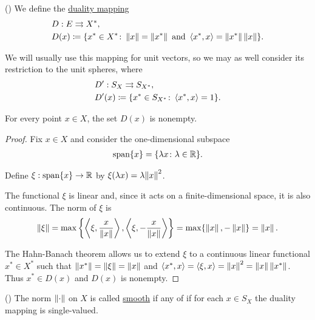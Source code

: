 \begin{definition}(\cite[Example 2.26]{Phelps1993})
  We define the \uline{duality mapping}
  \begin{align*}
    &D: E \rightrightarrows X^*, \\
    &D(x) \coloneqq \{ x^* \in X^* \colon \left\Vert x \right\Vert = \left\Vert x^* \right\Vert \text{ and } \left\langle x^*, x \right\rangle = \left\Vert x^* \right\Vert \left\Vert x \right\Vert \}.
  \end{align*}
\end{definition}

\begin{note}
  We will usually use this mapping for unit vectors, so we may as well consider its restriction to the unit spheres, where
  \begin{align*}
    &D': S_X \rightrightarrows S_{X^*}, \\
    &D'(x) \coloneqq \{ x^* \in S_{X^*} \colon \left\langle x^*, x \right\rangle = 1 \}.
  \end{align*}
\end{note}

\begin{lemma}\label{thm:nonempty_banach_duality_mapping}
  For every point $x \in X$, the set $D(x)$ is nonempty.
\end{lemma}
\begin{proof}
  Fix $x \in X$ and consider the one-dimensional subspace
  \begin{align*}
    \operatorname{span} \{ x \}
    =
    \{ \lambda x \colon \lambda \in \mathbb{R} \}.
  \end{align*}

  Define $\xi: \operatorname{span} \{ x \} \to \mathbb{R}$ by $\xi(\lambda x) = \lambda {\left\Vert x \right\Vert}^2$.

  The functional $\xi$ is linear and, since it acts on a finite-dimensional space, it is also continuous. The norm of $\xi$ is
  \begin{align*}
    \left\Vert \xi \right\Vert = \max \left\{ \left\langle \xi, \frac x {\left\Vert x \right\Vert} \right\rangle, \left\langle \xi, -\frac x {\left\Vert x \right\Vert} \right\rangle \right\} = \max \{ \left\Vert x \right\Vert, -\left\Vert x \right\Vert \} = \left\Vert x \right\Vert.
  \end{align*}

  The Hahn-Banach theorem allows us to extend $\xi$ to a continuous linear functional $x^* \in X^*$ such that $\left\Vert x^* \right\Vert = \left\Vert \xi \right\Vert = \left\Vert x \right\Vert$ and $\left\langle x^*, x \right\rangle = \left\langle \xi, x \right\rangle = \left\Vert x \right\Vert^2 = \left\Vert x \right\Vert \left\Vert x^* \right\Vert$. Thus $x^* \in D(x)$ and $D(x)$ is nonempty.
\end{proof}

\begin{definition}\label{def:smooth_norm}(\cite[Definition 2.36]{Phelps1993})
  The norm $\left\Vert \cdot \right\Vert$ on $X$ is called \uline{smooth} if any of  if for each $x \in S_X$ the duality mapping is single-valued.
\end{definition}

